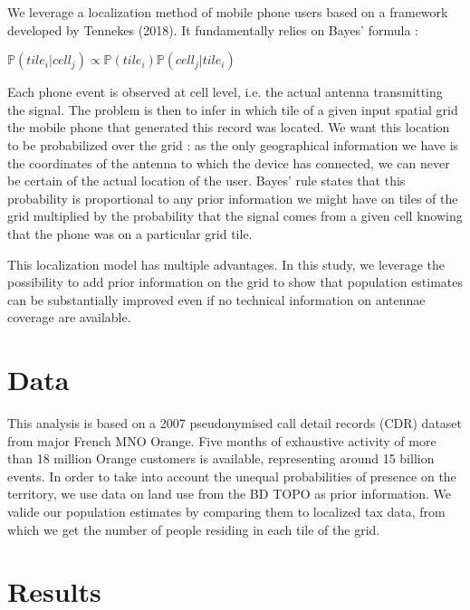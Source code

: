 \documentclass[12pt]{article}
\begin{document}
We leverage a localization method of mobile phone users based on a framework developed by Tennekes (2018). It fundamentally relies on Bayes' formula :

\begin{center}
\begingroup
\large
$\mathbb{P}(tile_i | cell_j) \propto \mathbb{P}(tile_i) \mathbb{P}(cell_j | tile_i)$
\endgroup
\end{center}

Each phone event is observed at cell level, i.e. the actual antenna transmitting the signal. 
The problem is then to infer in which tile of a given input spatial grid the mobile phone that generated this record was located. We want this location to be probabilized over the grid : as the only geographical information we have is the coordinates of the antenna to which the device has connected, we can never be certain of the actual location of the user. Bayes' rule states that this probability is proportional to any prior information we might have on tiles of the grid multiplied by the probability that the signal comes from a given cell knowing that the phone was on a particular grid tile.

This localization model has multiple advantages. In this study, we leverage the possibility to add prior information on the grid to show that population estimates can be substantially improved even if no technical information on antennae coverage are available.

\section{Data}

This analysis is based on a 2007 pseudonymised call detail records (CDR) dataset from major French MNO Orange. Five months of exhaustive activity of more than 18 million Orange customers is available, representing around 15 billion events. In order to take into account the unequal probabilities of presence on the territory, we use data on land use from the BD TOPO as prior information. We valide our population estimates by comparing them to localized tax data, from which we get the number of people residing in each tile of the grid.

\section{Results}
\end{document}
